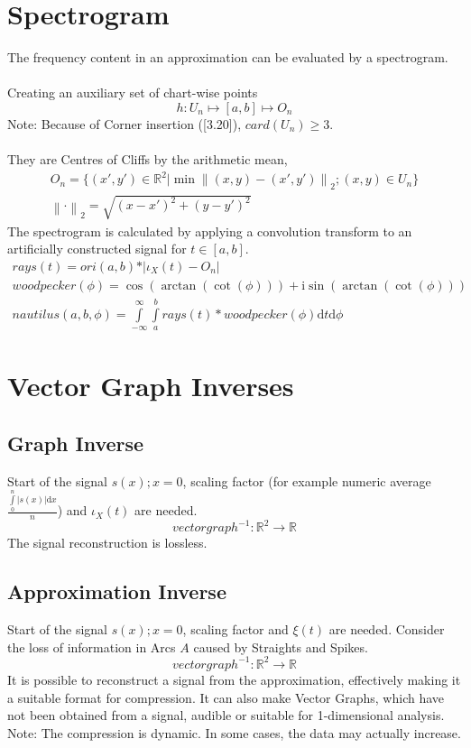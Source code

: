 \documentclass{report}
\newcommand\norm[1]{\left\lVert#1\right\rVert}
\begin{document}
\chapter{Spectrogram}
The frequency content in an approximation can be evaluated by a spectrogram.\\\\
Creating an auxiliary set of chart-wise points
\begin{equation}
h: U_{n} \mapsto [a,b] \mapsto O_{n}
\end{equation}
Note: Because of Corner insertion (\cite{Stopeight}[3.20]), $card(U_{n}) \geq 3$.\\\\
They are Centres of Cliffs by the arithmetic mean,
\begin{align}
O_{n}=\{(x',y') \in \mathbb{R}^2 \vert \min \norm{(x,y)-(x',y')}_{2};(x,y) \in U_{n} \}\\
\norm{\cdot}_{2}=\sqrt{(x-x')^2 + (y-y')^2}
\end{align}
The spectrogram is calculated by applying a convolution transform to an artificially constructed signal for $t \in [a,b]$.
\begin{align}
rays(t)=ori(a,b)*\vert\iota_{X}(t)-O_{n}\vert\\
woodpecker(\phi)=\cos(\arctan(\cot(\phi))) + \mathrm{i}\sin(\arctan(\cot(\phi)))\\
nautilus(a,b,\phi)=\int \limits _{-\infty}^{\infty}\int \limits _{a}^{b}rays(t)*woodpecker(\phi)\mathrm{d}t\mathrm{d}\phi
\end{align}

\chapter{Vector Graph Inverses}
\section{Graph Inverse}
Start of the signal $s(x);x=0$, scaling factor (for example numeric average $\frac{\int \limits _{0}^{n}\vert s(x)\vert \mathrm{d}x}{n}$) and $\iota_{X}(t)$ are needed.
\begin{equation}
vectorgraph^{-1}: \mathbb{R}^2 \rightarrow \mathbb{R}
\end{equation}
The signal reconstruction is lossless.
\section{Approximation Inverse}
Start of the signal $s(x);x=0$, scaling factor and $\xi(t)$ are needed. Consider the loss of information in Arcs $A$ caused by Straights and Spikes.
\begin{equation}
vectorgraph^{-1}: \mathbb{R}^2 \rightarrow \mathbb{R}
\end{equation}
It is possible to reconstruct a signal from the approximation, effectively making it a suitable format for compression. It can also make Vector Graphs, which have not been obtained from a signal, audible or suitable for 1-dimensional analysis.\\
Note: The compression is dynamic. In some cases, the data may actually increase.
\end{document}
